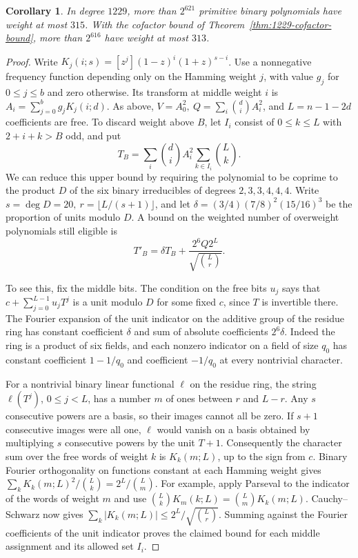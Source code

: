 \documentclass[11pt]{article}
\newtheorem{corollary}[theorem]{Corollary}
\begin{document}
\begin{corollary}\label{cor:fourier-weight-1229}
In degree \(1229\), more than \(2^{621}\) primitive binary polynomials
have weight at most \(315\). With the cofactor bound of
Theorem~\ref{thm:1229-cofactor-bound}, more than \(2^{616}\) have
weight at most \(313\).
\end{corollary}
\begin{proof}
Write \(K_j(i;s)=[z^j](1-z)^i(1+z)^{s-i}\). Use a nonnegative
frequency function depending only on the Hamming weight \(j\), with
value \(g_j\) for \(0\le j\le b\) and zero otherwise. Its transform
at middle weight \(i\) is \(A_i=\sum_{j=0}^b g_jK_j(i;d)\).
As above, \(V=A_0^2,\ Q=\sum_i\binom di A_i^2\), and
\(L=n-1-2d\) coefficients are free. To discard weight above \(B\),
let \(I_i\) consist of \(0\le k\le L\) with \(2+i+k>B\) odd, and put
\[
 T_B=\sum_i\binom di A_i^2\sum_{k\in I_i}\binom Lk .
\]
We can reduce this upper bound by requiring the polynomial to be
coprime to the product \(D\) of the six binary irreducibles of
degrees \(2,3,3,4,4,4\). Write \(s=\deg D=20,\ r=\lfloor
L/(s+1)\rfloor\), and let \(\delta=(3/4)(7/8)^2(15/16)^3\)
be the proportion of units modulo \(D\). A bound on the weighted
number of overweight polynomials still eligible is
\[
 T'_B=\delta T_B+\frac{2^6 Q2^L}{\sqrt{\binom Lr}} .
\]

To see this, fix the middle bits. The condition on the free bits
\(u_j\) says that \(c+\sum_{j=0}^{L-1}u_jT^j\) is a unit modulo
\(D\) for some fixed \(c\), since \(T\) is invertible there.
The Fourier expansion of the unit indicator on the additive group
of the residue ring has constant coefficient \(\delta\) and sum of
absolute coefficients \(2^6\delta\). Indeed the ring is a product
of six fields, and each nonzero indicator on a field of size \(q_0\)
has constant coefficient \(1-1/q_0\) and coefficient \(-1/q_0\) at
every nontrivial character.

For a nontrivial binary linear functional \(\ell\) on the residue ring,
the string \(\ell(T^j)\), \(0\le j<L\), has a number \(m\) of ones
between \(r\) and \(L-r\). Any \(s\) consecutive powers are a basis,
so their images cannot all be zero. If \(s+1\) consecutive images
were all one, \(\ell\) would vanish on a basis obtained by multiplying
\(s\) consecutive powers by the unit \(T+1\).
Consequently the character sum over the free words of weight \(k\)
is \(K_k(m;L)\), up to the sign from \(c\). Binary Fourier orthogonality
on functions constant at each Hamming weight gives
\(\sum_k K_k(m;L)^2/\binom Lk=2^L/\binom Lm\).
For example, apply Parseval to the indicator of the words of weight
\(m\) and use \(\binom Lk K_m(k;L)=\binom Lm K_k(m;L)\).
Cauchy--Schwarz now gives
\(\sum_k|K_k(m;L)|\le2^L/\sqrt{\binom Lr}\).
Summing against the Fourier coefficients of the unit indicator proves
the claimed bound for each middle assignment and its allowed set \(I_i\).


\end{proof}
\end{document}
